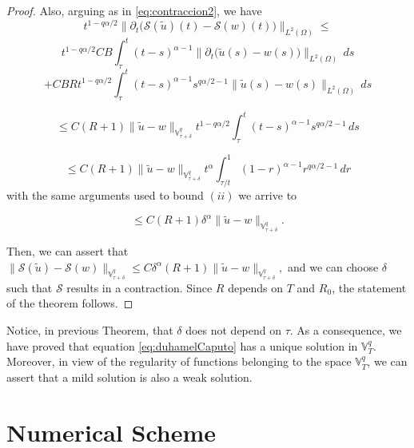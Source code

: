 \documentclass{amsart}
\newcommand{\ele}{L^2(\Omega)}
\newcommand{\ppa}{\leftidx{^C}\partial_t^\alpha}
\newcommand{\W}{\Omega}
\newcommand{\hsT}{\widetilde{H}^s (\W)}
\newcommand{\V}{\mathbb{V}^q}
\newcommand{\peligro}[1]{\textcolor{red}{#1}}
\theoremstyle{remark}
\theoremstyle{definition}
\numberwithin{equation}{section}
\begin{document}
\begin{proof}
Also, arguing as in \eqref{eq:contraccion2}, we have
\begin{equation}
\label{eq:glogal4}
t^{1-q\alpha/2}\|\partial_t \big( \mathcal{S}(\tilde{u})(t) - \mathcal{S}(w)(t)  \big) \|_{\ele} \leq 
\end{equation}
$$
t^{1-q\alpha/2}CB\int^{t}_{\tau} (t-s)^{\alpha - 1} \|\partial_t\big( \tilde{u}(s)- w(s) \big) \|_{\ele} \,ds
$$
$$+ CBRt^{1-q\alpha/2}\int^{t}_{\tau} (t-s)^{\alpha - 1} s^{q\alpha/2-1}\|\tilde{u}(s)- w(s) \|_{\ele} \,ds$$

$$\leq C(R+1) \|\tilde{u}-w\|_{\V_{\tau + \delta}} t^{1-q\alpha/2}\int^{t}_{\tau} (t-s)^{\alpha - 1} s^{q\alpha/2-1} \,ds$$


$$\leq C(R+1) \|\tilde{u}-w\|_{\V_{\tau + \delta}} t^{\alpha}\int^{1}_{\tau/t} (1-r)^{\alpha - 1} r^{q\alpha/2-1} \,dr$$
with the same arguments used to bound $(ii)$ we arrive to 


$$ \leq  C(R+1) \delta^{\alpha}\|\tilde{u}-w\|_{\V_{\tau + \delta}}.$$ 

 Then, we can assert that  $\|\mathcal{S}(\tilde{u}) - \mathcal{S}(w) \|_{\V_{\tau+\delta}} \leq C\delta^{\alpha}(R+1) \|\tilde{u}-w\|_{\V_{\tau + \delta}}, $
and we can choose $\delta$ such that $\mathcal{S}$ results in a contraction. Since $R$ depends on $T$ and $R_0$, the statement of the theorem follows.\end{proof}

 Notice, in previous Theorem, that $\delta$ does not depend on $\tau$. As a consequence, we have proved that equation \ref{eq:duhamelCaputo} has a unique solution in $\V_T$. Moreover, in view of the regularity of functions belonging to the space $\V_{T}$, we can assert that a mild solution is also a weak solution. 





 
\section{Numerical Scheme} \label{sec:ns}
\end{document}
